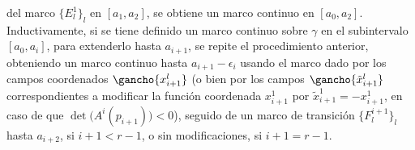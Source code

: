 del marco $\{E^{1}_{l}\}_{l}$ en $[a_{1},a_{2}]$, se obtiene un marco
continuo en $[a_{0},a_{2}]$. Inductivamente, si se tiene definido un
marco continuo sobre $\gamma$ en el subintervalo $[a_{0},a_{i}]$, para
extenderlo hasta $a_{i+1}$, se repite el procedimiento anterior, obteniendo
un marco continuo hasta $a_{i+1}-\epsilon_{i}$ usando el
marco dado por los campos coordenados $\gancho{x_{i+1}^{l}}$ (o bien por
los campos $\gancho{\tilde{x}_{i+1}^{l}}$ correspondientes a modificar
la funci\'{o}n coordenada $x_{i+1}^{1}$ por $\tilde{x}_{i+1}^{1}=-x_{i+1}^{1}$,
en caso de que $\det\big(A^{i}(p_{i+1})\big)<0$), seguido de un marco
de transici\'{o}n $\{F^{i+1}_{l}\}_{l}$ hasta $a_{i+2}$, si $i+1<r-1$, o
sin modificaciones, si $i+1=r-1$.

